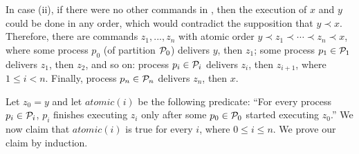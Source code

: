 In case (ii), if there were no other commands in \ex, then the execution of $x$ and $y$ could be done in any order, which would contradict the supposition that $y \prec x$.
Therefore, there are commands $z_1, ..., z_n$ with atomic order $y \prec z_1 \prec \cdots \prec z_n \prec x$, where some process $p_0$ (of partition $\mathcal{P}_0$) delivers $y$, then $z_1$; some process $p_1 \in \mathcal{P}_1$ delivers $z_1$, then $z_2$, and so on: process $p_i \in \mathcal{P}_i$ delivers $z_{i}$, then $z_{i+1}$, where $1 \leq i < n$.
Finally, process $p_n \in \mathcal{P}_n$ delivers $z_n$, then $x$.

Let $z_0 = y$ and let $atomic(i)$ be the following predicate:
``For every process $p_i \in \mathcal{P}_i$, $p_i$ finishes executing $z_i$ only after some $p_0 \in \mathcal{P}_0$ started executing $z_0$.''
We now claim that $atomic(i)$ is true for every $i$, where $0 \leq i \leq n$.
We prove our claim by induction.
